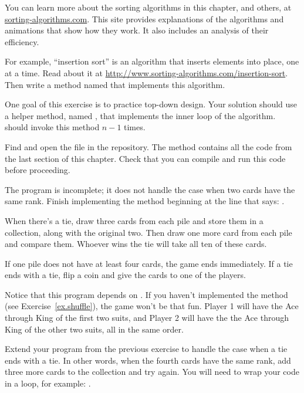 \begin{exercise}

You can learn more about the sorting algorithms in this chapter, and others, at \href{http://www.sorting-algorithms.com/}{sorting-algorithms.com}.
This site provides explanations of the algorithms and animations that show how they work.
It also includes an analysis of their efficiency.

For example, ``insertion sort'' is an algorithm that inserts elements into place, one at a time.
Read about it at \url{http://www.sorting-algorithms.com/insertion-sort}.
Then write a method named  that implements this algorithm.

One goal of this exercise is to practice top-down design.
Your solution should use a helper method, named , that implements the inner loop of the algorithm.
 should invoke this method $n-1$ times.


\end{exercise}


\begin{exercise}  %

Find and open the file  in the repository.
The  method contains all the code from the last section of this chapter.
Check that you can compile and run this code before proceeding.

The program is incomplete; it does not handle the case when two cards have the same rank.
Finish implementing the  method beginning at the line that says: .

When there's a tie, draw three cards from each pile and store them in a collection, along with the original two.
Then draw one more card from each pile and compare them.
Whoever wins the tie will take all ten of these cards.

If one pile does not have at least four cards, the game ends immediately.
If a tie ends with a tie, flip a coin and give the cards to one of the players.

Notice that this program depends on .
If you haven't implemented the  method (see Exercise~\ref{ex.shuffle}), the game won't be that fun.
Player 1 will have the Ace through King of the first two suits, and Player 2 will have the the Ace through King of the other two suits, all in the same order.

\end{exercise}


\begin{exercise}  %

Extend your program from the previous exercise to handle the case when a tie ends with a tie.
In other words, when the fourth cards have the same rank, add three more cards to the collection and try again.
You will need to wrap your code in a loop, for example: .

\end{exercise}
